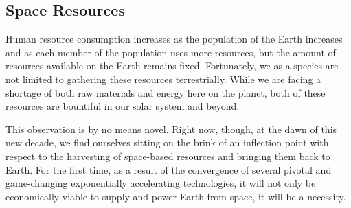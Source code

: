 \documentclass[letter,11pt]{article}
\begin{document}

\subsection{Space Resources}
\label{ps-space-resources}
Human resource consumption increases as the population of the Earth
increases and as each member of the population uses more resources,
but the amount of resources available on the Earth remains fixed.
Fortunately, we as a species are not limited to gathering these resources
terrestrially. While we are facing a shortage of both raw materials\cite{gordon}
and energy\cite{Seboldt2004} here on the planet, both of these resources are bountiful
in our solar system and beyond.

This observation is by no means novel. Right now, though, at the dawn
of this new decade, we find ourselves sitting on the brink of an inflection
point with respect to the harvesting of space-based resources and
bringing them back to Earth. For the first time, as a result of the
convergence of several pivotal and game-changing exponentially accelerating
technologies, it will not only be economically viable to supply and
power Earth from space, it will be a necessity.
\end{document}
